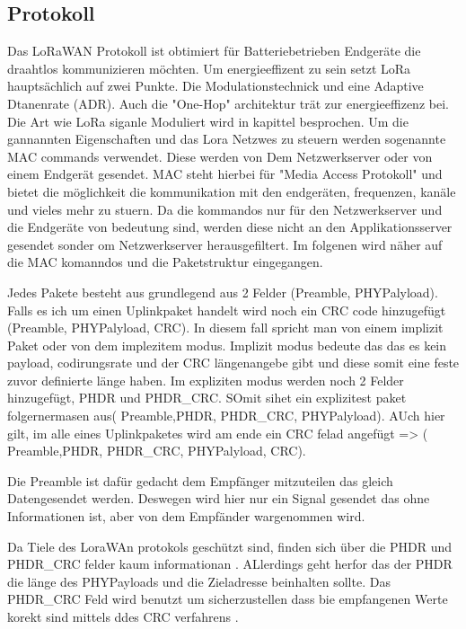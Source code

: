 \documentclass[a4paper,12pt]{article}
\begin{document}
        \subsection{Protokoll} \label{sec:protokoll}
            Das LoRaWAN Protokoll ist obtimiert für Batteriebetrieben Endgeräte die draahtlos kommunizieren möchten. Um energieeffizent zu sein setzt LoRa hauptsächlich auf zwei Punkte. Die Modulationstechnick und eine Adaptive Dtanenrate (ADR). Auch die 
            "One-Hop" architektur trät zur energieeffizenz bei. Die Art wie LoRa siganle Moduliert wird in kapittel  besprochen. Um die gannannten Eigenschaften und das Lora Netzwes zu steuern werden sogenannte MAC commands verwendet. 
            Diese werden von Dem Netzwerkserver oder von einem Endgerät gesendet. MAC steht hierbei für "Media Access Protokoll" und bietet die möglichkeit die kommunikation mit den endgeräten, frequenzen, kanäle und vieles mehr zu stuern. 
            Da die kommandos nur für den Netzwerkserver und die Endgeräte von bedeutung sind, werden diese nicht an den Applikationsserver gesendet sonder om Netzwerkserver herausgefiltert. Im folgenen wird näher auf die MAC komanndos und die Paketstruktur eingegangen.

            Jedes Pakete besteht aus grundlegend aus 2 Felder (Preamble,  PHYPalyload).  Falls es ich um einen Uplinkpaket handelt wird noch ein CRC code hinzugefügt   (Preamble,  PHYPalyload, CRC). 
            In diesem fall spricht man von einem implizit Paket oder von dem implezitem modus. Implizit modus bedeute das das es kein payload, codirungsrate und der CRC längenangebe gibt und diese somit eine feste zuvor definierte länge haben. Im expliziten modus werden noch 2 Felder hinzugefügt, 
            PHDR und PHDR\_CRC. SOmit sihet ein explizitest paket folgernermasen aus( Preamble,PHDR, PHDR\_CRC, PHYPalyload). AUch hier gilt, im alle eines Uplinkpaketes wird am ende ein CRC felad angefügt => ( Preamble,PHDR, PHDR\_CRC, PHYPalyload, CRC).
            
            Die Preamble ist dafür gedacht dem Empfänger mitzuteilen das gleich Datengesendet werden. Deswegen wird hier nur ein Signal gesendet das ohne Informationen ist, aber von dem Empfänder wargenommen wird.

            Da Tiele des LoraWAn protokols geschützt sind, finden sich über die PHDR und PHDR\_CRC felder kaum informationan . ALlerdings geht herfor das der PHDR die länge des PHYPayloads und die Zieladresse beinhalten sollte. 
            Das PHDR\_CRC Feld wird benutzt um sicherzustellen dass bie empfangenen Werte korekt sind mittels ddes CRC verfahrens .
            
\end{document}
